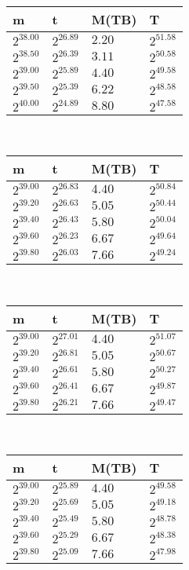  \ 
\begin{tabular}{llll}
m & t & M(TB) & T \\ \hline
$2^{38.00}$ & $2^{26.89}$ & $2.20$ & $2^{51.58}$ \\
$2^{38.50}$ & $2^{26.39}$ & $3.11$ & $2^{50.58}$ \\
$2^{39.00}$ & $2^{25.89}$ & $4.40$ & $2^{49.58}$ \\
$2^{39.50}$ & $2^{25.39}$ & $6.22$ & $2^{48.58}$ \\
$2^{40.00}$ & $2^{24.89}$ & $8.80$ & $2^{47.58}$ \\
\end{tabular}
 \ 
\begin{tabular}{llll}
m & t & M(TB) & T \\ \hline
$2^{39.00}$ & $2^{26.83}$ & $4.40$ & $2^{50.84}$ \\
$2^{39.20}$ & $2^{26.63}$ & $5.05$ & $2^{50.44}$ \\
$2^{39.40}$ & $2^{26.43}$ & $5.80$ & $2^{50.04}$ \\
$2^{39.60}$ & $2^{26.23}$ & $6.67$ & $2^{49.64}$ \\
$2^{39.80}$ & $2^{26.03}$ & $7.66$ & $2^{49.24}$ \\
\end{tabular}
 \ 
\begin{tabular}{llll}
m & t & M(TB) & T \\ \hline
$2^{39.00}$ & $2^{27.01}$ & $4.40$ & $2^{51.07}$ \\
$2^{39.20}$ & $2^{26.81}$ & $5.05$ & $2^{50.67}$ \\
$2^{39.40}$ & $2^{26.61}$ & $5.80$ & $2^{50.27}$ \\
$2^{39.60}$ & $2^{26.41}$ & $6.67$ & $2^{49.87}$ \\
$2^{39.80}$ & $2^{26.21}$ & $7.66$ & $2^{49.47}$ \\
\end{tabular}
 \ 
\begin{tabular}{llll}
m & t & M(TB) & T \\ \hline
$2^{39.00}$ & $2^{25.89}$ & $4.40$ & $2^{49.58}$ \\
$2^{39.20}$ & $2^{25.69}$ & $5.05$ & $2^{49.18}$ \\
$2^{39.40}$ & $2^{25.49}$ & $5.80$ & $2^{48.78}$ \\
$2^{39.60}$ & $2^{25.29}$ & $6.67$ & $2^{48.38}$ \\
$2^{39.80}$ & $2^{25.09}$ & $7.66$ & $2^{47.98}$ \\
\end{tabular}
